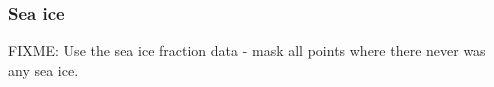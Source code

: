 \subsubsection{Sea ice}

FIXME: Use the sea ice fraction data - mask all points where there never was any sea ice.